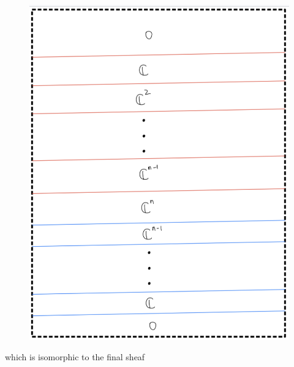 \begin{enumerate}[label = (\roman*)]
\begin{enumerate}[label = (Step \arabic*)]
\begin{figure}[H]
    \centering
    \includegraphics[scale = 0.95]{diagrams/cobord_inter/7.png}
    \caption{}
    \label{fig:your-label}
\end{figure}
\pagebreak
which is isomorphic to the final sheaf
\begin{figure}[H]
    \centering

\end{figure}
\end{enumerate}
\end{enumerate}
